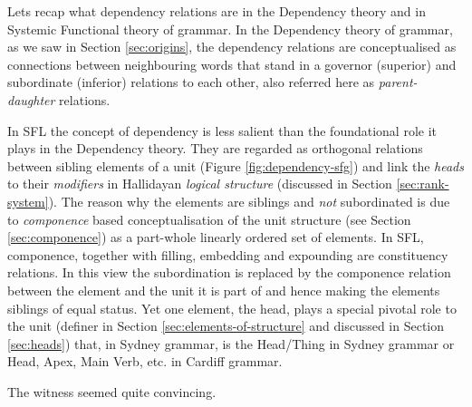 
Lets recap what dependency relations are in the Dependency theory and in Systemic Functional theory of grammar. In the Dependency theory of grammar, as we saw in Section \ref{sec:origins}, the dependency relations are conceptualised as connections between neighbouring words that stand in a governor (superior) and subordinate (inferior) relations to each other, also referred here as \textit{parent-daughter} relations. 

In SFL the concept of dependency is less salient than the foundational role it plays in the Dependency theory. They are regarded as orthogonal relations between sibling elements of a unit (Figure \ref{fig:dependency-sfg}) and link the \textit{heads} to their \textit{modifiers} in Hallidayan \textit{logical structure}\citep[388]{Halliday2013} (discussed in Section \ref{sec:rank-system}). The reason why the elements are siblings and \textit{not} subordinated is due to \textit{componence} based conceptualisation of the unit structure (see Section \ref{sec:componence}) as a part-whole linearly ordered set of elements. In SFL, componence, together with filling, embedding and expounding are constituency relations. In this view the subordination is replaced by the componence relation between the element and the unit it is part of and hence making the elements siblings of equal status. Yet one element, the head, plays a special pivotal role to the unit (definer in Section \ref{sec:elements-of-structure} and discussed in Section \ref{sec:heads}) that, in Sydney grammar, is the Head/Thing in Sydney grammar or Head, Apex, Main Verb, etc. in Cardiff grammar.


\begin{exe}
    \ex\label{ex:witness} The witness seemed quite convincing. 
\end{exe}

